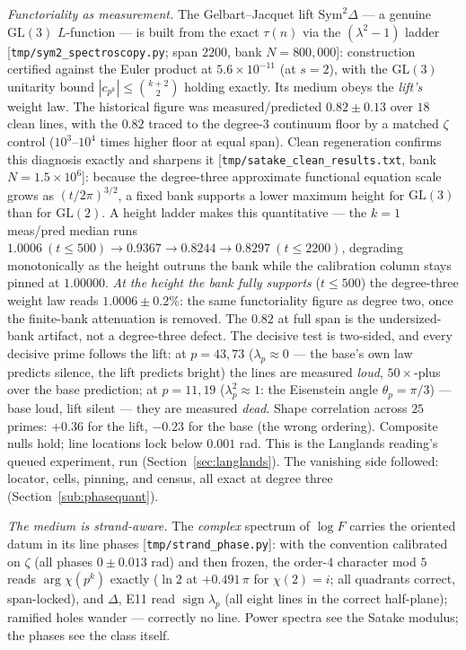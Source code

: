 \documentclass[11pt]{article}
\newcommand{\code}[1]{\texttt{#1}}
\begin{document}
\emph{Functoriality as measurement.}  The Gelbart--Jacquet lift $\mathrm{Sym}^2\Delta$ --- a
genuine $\mathrm{GL}(3)$ $L$-function --- is built from the exact $\tau(n)$ via the
$(\lambda^2-1)$ ladder [\code{tmp/sym2\_spectroscopy.py}; span $2200$, bank $N=800{,}000$]:
construction certified against the Euler product at $5.6\times10^{-11}$ (at $s=2$), with the
$\mathrm{GL}(3)$ unitarity bound $|c_{p^k}|\le\binom{k+2}{2}$ holding exactly.  Its medium obeys
the \emph{lift's} weight law.  The historical figure was measured/predicted $0.82\pm0.13$ over
$18$ clean lines, with the $0.82$ traced to the degree-$3$ continuum floor by a matched $\zeta$
control ($10^{3}$--$10^{4}$ times higher floor at equal span).  Clean regeneration confirms this
diagnosis exactly and sharpens it [\code{tmp/satake\_clean\_results.txt}, bank $N=1.5\times10^{6}$]:
because the degree-three approximate functional equation scale grows as $(t/2\pi)^{3/2}$, a fixed
bank supports a lower maximum height for $\mathrm{GL}(3)$ than for $\mathrm{GL}(2)$.  A height
ladder makes this quantitative --- the $k=1$ meas/pred median runs
$1.0006\ (t\le500)\to0.9367\to0.8244\to0.8297\ (t\le2200)$, degrading monotonically as the
height outruns the bank while the calibration column stays pinned at $1.00000$.  \emph{At the
height the bank fully supports} ($t\le500$) the degree-three weight law reads
$1.0006\pm0.2\%$: the same functoriality figure as degree two, once the finite-bank attenuation
is removed.  The $0.82$ at full span is the undersized-bank artifact, not a degree-three defect.
The decisive
test is two-sided, and every decisive prime follows the lift: at $p=43,73$
($\lambda_p\approx0$ --- the base's own law predicts silence, the lift predicts bright) the lines
are measured \emph{loud}, $50\times$-plus over the base prediction; at $p=11,19$
($\lambda_p^2\approx1$: the Eisenstein angle $\theta_p=\pi/3$) --- base loud, lift silent --- they
are measured \emph{dead}.  Shape correlation across $25$ primes: $+0.36$ for the lift, $-0.23$ for
the base (the wrong ordering).  Composite nulls hold; line locations lock below $0.001$ rad.  This
is the Langlands reading's queued experiment, run (Section~\ref{sec:langlands}).  The vanishing
side followed: locator, cells, pinning, and census, all exact at degree three
(Section~\ref{sub:phasequant}).

\emph{The medium is strand-aware.}  The \emph{complex} spectrum of $\log F$ carries the oriented
datum in its line phases [\code{tmp/strand\_phase.py}]: with the convention calibrated on $\zeta$
(all phases $0\pm0.013$ rad) and then frozen, the order-$4$ character mod $5$ reads
$\arg\chi(p^k)$ exactly ($\ln2$ at $+0.491\,\pi$ for $\chi(2)=i$; all quadrants correct,
span-locked), and $\Delta$, E11 read $\operatorname{sign}\lambda_p$ (all eight lines in the
correct half-plane); ramified holes wander --- correctly no line.  Power spectra see the Satake
modulus; the phases see the class itself.
\end{document}
